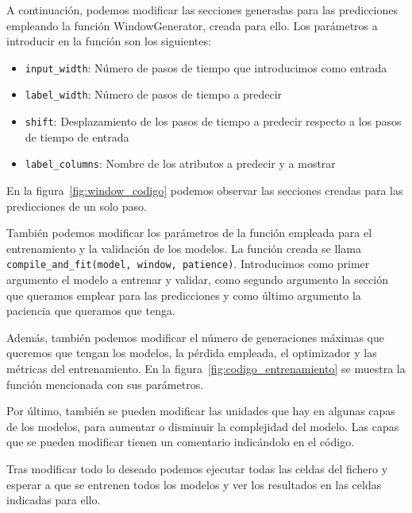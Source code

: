 
A continuación, podemos modificar las secciones generadas para las predicciones empleando la función WindowGenerator, creada para ello. Los parámetros a introducir en la función son los siguientes:

\begin{itemize}
    \item \texttt{input\_width}: Número de pasos de tiempo que introducimos como entrada
    \item \texttt{label\_width}: Número de pasos de tiempo a predecir
    \item \texttt{shift}: Desplazamiento de los pasos de tiempo a predecir respecto a los pasos de tiempo de entrada
    \item \texttt{label\_columns}: Nombre de los atributos a predecir y a mostrar
\end{itemize}

En la figura~\ref{fig:window_codigo} podemos observar las secciones creadas para las predicciones de un solo paso.


También podemos modificar los parámetros de la función empleada para el entrenamiento y la validación de los modelos. La función creada se llama \texttt{compile\_and\_fit(model, window, patience)}. Introducimos como primer argumento el modelo a entrenar y validar, como segundo argumento la sección que queramos emplear para las predicciones y como último argumento la paciencia que queramos que tenga.

\par

Además, también podemos modificar el número de generaciones máximas que queremos que tengan los modelos, la pérdida empleada, el optimizador y las métricas del entrenamiento. En la figura~\ref{fig:codigo_entrenamiento} se muestra la función mencionada con sus parámetros.


Por último, también se pueden modificar las unidades que hay en algunas capas de los modelos, para aumentar o disminuir la complejidad del modelo. Las capas que se pueden modificar tienen un comentario indicándolo en el código.

\par

Tras modificar todo lo deseado podemos ejecutar todas las celdas del fichero y esperar a que se entrenen todos los modelos y ver los resultados en las celdas indicadas para ello.